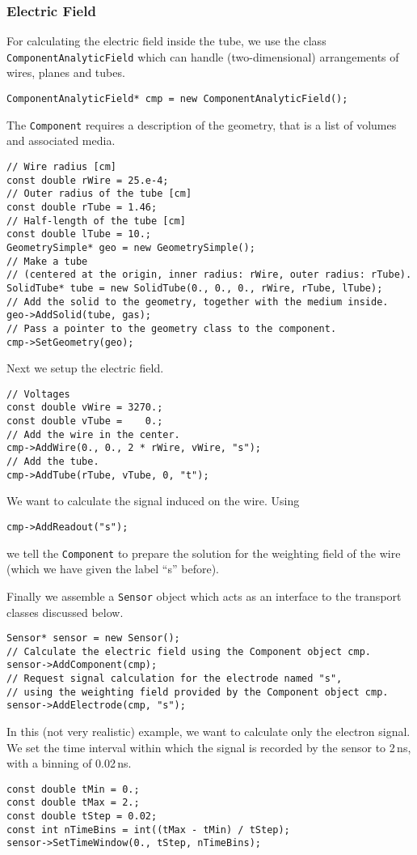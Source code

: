 \subsubsection{Electric Field}
For calculating the electric field inside the tube, 
we use the class \texttt{ComponentAnalyticField} which can handle 
(two-dimensional) arrangements of wires, planes and tubes.
\begin{lstlisting}
ComponentAnalyticField* cmp = new ComponentAnalyticField();
\end{lstlisting} 
The \texttt{Component} requires a description of the 
geometry, that is a list of volumes and associated media.
\begin{lstlisting}
// Wire radius [cm]
const double rWire = 25.e-4;
// Outer radius of the tube [cm]
const double rTube = 1.46;
// Half-length of the tube [cm]
const double lTube = 10.;
GeometrySimple* geo = new GeometrySimple();
// Make a tube 
// (centered at the origin, inner radius: rWire, outer radius: rTube).
SolidTube* tube = new SolidTube(0., 0., 0., rWire, rTube, lTube);
// Add the solid to the geometry, together with the medium inside.
geo->AddSolid(tube, gas);
// Pass a pointer to the geometry class to the component.
cmp->SetGeometry(geo); 
\end{lstlisting}
Next we setup the electric field.
\begin{lstlisting}
// Voltages
const double vWire = 3270.;
const double vTube =    0.;
// Add the wire in the center.
cmp->AddWire(0., 0., 2 * rWire, vWire, "s");
// Add the tube.
cmp->AddTube(rTube, vTube, 0, "t");
\end{lstlisting}
We want to calculate the signal induced on the wire. 
Using 
\begin{lstlisting}
cmp->AddReadout("s");
\end{lstlisting}
we tell the \texttt{Component} to prepare the solution for the weighting field 
of the wire (which we have given the label ``s'' before).
 
Finally we assemble a \texttt{Sensor} object which acts as an 
interface to the transport classes discussed below.
\begin{lstlisting}
Sensor* sensor = new Sensor();
// Calculate the electric field using the Component object cmp.
sensor->AddComponent(cmp);
// Request signal calculation for the electrode named "s", 
// using the weighting field provided by the Component object cmp.
sensor->AddElectrode(cmp, "s"); 
\end{lstlisting}

In this (not very realistic) example, we want to calculate only the 
electron signal. We set the time interval within which the 
signal is recorded by the sensor to 2\,ns, with a binning of 0.02\,ns. 
\begin{lstlisting}
const double tMin = 0.;
const double tMax = 2.;
const double tStep = 0.02;
const int nTimeBins = int((tMax - tMin) / tStep);
sensor->SetTimeWindow(0., tStep, nTimeBins);
\end{lstlisting}

